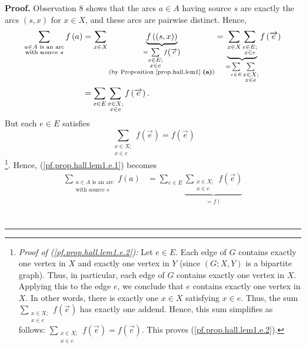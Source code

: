 \documentclass[numbers=enddot,12pt,final,onecolumn,notitlepage]{scrartcl}%
\theoremstyle{definition}
\newenvironment{proof}[1][Proof]{\noindent\textbf{#1.} }{\ \rule{0.5em}{0.5em}}
\let\sumnonlimits\sum
\renewcommand{\sum}{\sumnonlimits\limits}
\begin{document}
\begin{proof}
Observation 8 shows that the arcs $a\in A$ having source $s$ are exactly the
arcs $\left(  s,x\right)  $ for $x\in X$, and these arcs are pairwise
distinct. Hence,%
\begin{align}
\sum_{\substack{a\in A\text{ is an arc}\\\text{with source }s}}f\left(
a\right)   &  =\sum_{x\in X}\underbrace{f\left(  \left(  s,x\right)  \right)
}_{\substack{=\sum_{\substack{e\in E;\\x\in e}}f\left(  \overrightarrow{e}%
\right)  \\\text{(by Proposition \ref{prop.hall.lem1} \textbf{(a)})}%
}}=\underbrace{\sum_{x\in X}\sum_{\substack{e\in E;\\x\in e}}}_{=\sum_{e\in
E}\sum_{\substack{x\in X;\\x\in e}}}f\left(  \overrightarrow{e}\right)
\nonumber\\
&  =\sum_{e\in E}\sum_{\substack{x\in X;\\x\in e}}f\left(  \overrightarrow{e}%
\right)  . \label{pf.prop.hall.lem1.e.1}%
\end{align}
But each $e\in E$ satisfies
\begin{equation}
\sum_{\substack{x\in X;\\x\in e}}f\left(  \overrightarrow{e}\right)  =f\left(
\overrightarrow{e}\right)  \label{pf.prop.hall.lem1.e.2}%
\end{equation}
\footnote{\textit{Proof of (\ref{pf.prop.hall.lem1.e.2}):} Let $e\in E$. Each
edge of $G$ contains exactly one vertex in $X$ and exactly one vertex in $Y$
(since $\left(  G;X,Y\right)  $ is a bipartite graph). Thus, in particular,
each edge of $G$ contains exactly one vertex in $X$. Applying this to the edge
$e$, we conclude that $e$ contains exactly one vertex in $X$. In other words,
there is exactly one $x\in X$ satisfying $x\in e$. Thus, the sum
$\sum_{\substack{x\in X;\\x\in e}}f\left(  \overrightarrow{e}\right)  $ has
exactly one addend. Hence, this sum simplifies as follows: $\sum
_{\substack{x\in X;\\x\in e}}f\left(  \overrightarrow{e}\right)  =f\left(
\overrightarrow{e}\right)  $. This proves (\ref{pf.prop.hall.lem1.e.2}).}.
Hence, (\ref{pf.prop.hall.lem1.e.1}) becomes%
\begin{align}
\sum_{\substack{a\in A\text{ is an arc}\\\text{with source }s}}f\left(
a\right)   &  =\sum_{e\in E}\underbrace{\sum_{\substack{x\in X;\\x\in
e}}f\left(  \overrightarrow{e}\right)  }_{\substack{=f\left(
}}
\end{align}
\end{proof}
\end{document}
